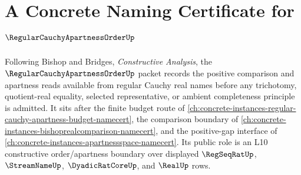 \chapter{A Concrete Naming Certificate for $\RegularCauchyApartnessOrderUp$}
\label{ch:concrete-instances-regular-cauchy-apartness-order-namecert}

Following Bishop and Bridges, \emph{Constructive Analysis}, the $\RegularCauchyApartnessOrderUp$ packet records the positive comparison and apartness reads available from regular Cauchy real names before any trichotomy, quotient-real equality, selected representative, or ambient completeness principle is admitted. It sits after the finite budget route of \autoref{ch:concrete-instances-regular-cauchy-apartness-budget-namecert}, the comparison boundary of \autoref{ch:concrete-instances-bishoprealcomparison-namecert}, and the positive-gap interface of \autoref{ch:concrete-instances-apartnessspace-namecert}. Its public role is an L10 constructive order/apartness boundary over displayed $\RegSeqRatUp$, $\StreamNameUp$, $\DyadicRatCoreUp$, and $\RealUp$ rows.


